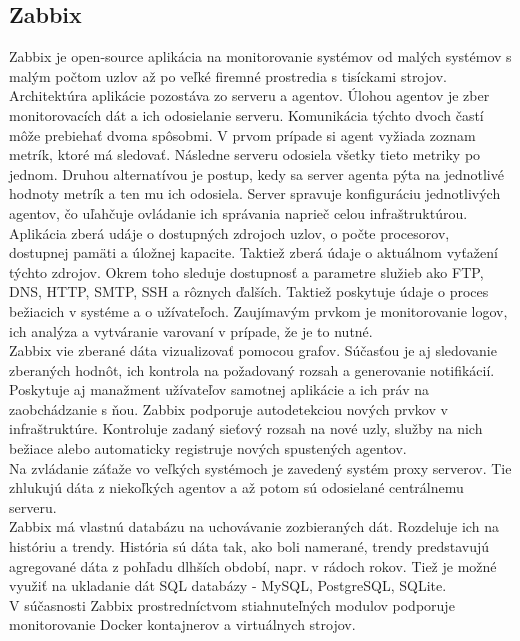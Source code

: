 \documentclass[12pt,twoside,color,cover,table]{fithesis3}
\begin{document}
\subsection{Zabbix}
Zabbix je open-source aplikácia na monitorovanie systémov od malých systémov s malým počtom uzlov až po veľké firemné prostredia s tisíckami strojov. Architektúra aplikácie pozostáva zo serveru a agentov.
Úlohou agentov je zber monitorovacích dát a ich odosielanie serveru. Komunikácia týchto dvoch častí môže prebiehať dvoma spôsobmi. V prvom prípade si agent vyžiada zoznam metrík, ktoré má sledovať. Následne 
serveru odosiela všetky tieto metriky po jednom. Druhou alternatívou je postup, kedy sa server agenta pýta na jednotlivé hodnoty metrík a ten mu ich odosiela. Server spravuje konfiguráciu jednotlivých agentov,
čo uľahčuje ovládanie ich správania naprieč celou infraštruktúrou.
\\Aplikácia zberá udáje o dostupných zdrojoch uzlov, o počte procesorov, dostupnej pamäti a úložnej kapacite. Taktiež zberá údaje o aktuálnom vyťažení týchto zdrojov. Okrem toho sleduje dostupnosť a parametre
služieb ako FTP, DNS, HTTP, SMTP, SSH a rôznych ďalších. Taktiež poskytuje údaje o proces bežiacich v systéme a o užívateľoch. Zaujímavým prvkom je monitorovanie logov, ich analýza a vytváranie varovaní 
v prípade, že je to nutné.
\\Zabbix vie zberané dáta vizualizovať pomocou grafov. Súčasťou je aj sledovanie zberaných hodnôt, ich kontrola na požadovaný rozsah a generovanie notifikácií. Poskytuje aj manažment užívateľov samotnej 
aplikácie a ich práv na zaobchádzanie s ňou. Zabbix podporuje autodetekciou nových prvkov v infraštruktúre. Kontroluje zadaný sieťový rozsah na nové uzly, služby na nich bežiace alebo automaticky registruje
nových spustených agentov.
\\Na zvládanie záťaže vo veľkých systémoch je zavedený systém proxy serverov. Tie zhlukujú dáta z niekoľkých agentov a až potom sú odosielané centrálnemu serveru.
\\Zabbix má vlastnú databázu na uchovávanie zozbieraných dát. Rozdeluje ich na históriu a trendy. História sú dáta tak, ako boli namerané, trendy predstavujú agregované dáta z pohľadu dlhších období, napr. v 
rádoch rokov. Tiež je možné využiť na ukladanie dát SQL databázy - MySQL, PostgreSQL, SQLite.
\\V súčasnosti Zabbix prostredníctvom stiahnuteľných modulov podporuje monitorovanie Docker kontajnerov a virtuálnych strojov.
\end{document}
